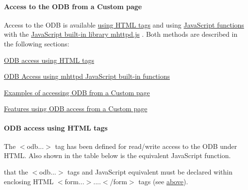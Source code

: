  \paragraph{Access to the ODB from a Custom page}\label{RC_mhttpd_custom_ODB_access}
\par




\par


Access to the ODB is available \hyperlink{RC_mhttpd_custom_ODB_access_RC_mhttpd_custom_odb_html}{using HTML tags} and using \hyperlink{RC_mhttpd_custom_ODB_access_RC_mhttpd_custom_odb_js}{JavaScript functions} with the \hyperlink{RC_mhttpd_custom_js_lib}{JavaScript built-\/in library mhttpd.js} . Both methods are described in the following sections:


\begin{DoxyItemize}
\item \hyperlink{RC_mhttpd_custom_ODB_access_RC_mhttpd_custom_odb_html}{ODB access using HTML tags}
\item \hyperlink{RC_mhttpd_custom_ODB_access_RC_mhttpd_custom_odb_js}{ODB Access using mhttpd JavaScript built-\/in functions}
\item \hyperlink{RC_mhttpd_custom_ODB_access_examples}{Examples of accessing ODB from a Custom page}
\item \hyperlink{RC_mhttpd_custom_ODB_access_features}{Features using ODB access from a Custom page}
\end{DoxyItemize}

\label{RC_mhttpd_custom_ODB_access_idx_odb-HTML-tag}
\hypertarget{RC_mhttpd_custom_ODB_access_idx_odb-HTML-tag}{}
 \hypertarget{RC_mhttpd_custom_ODB_access_RC_mhttpd_custom_odb_html}{}\paragraph{ODB access using HTML tags}\label{RC_mhttpd_custom_ODB_access_RC_mhttpd_custom_odb_html}
The $<$odb...$>$ tag has been defined for read/write access to the ODB under HTML. Also shown in the table below is the equivalent JavaScript function.

that the $<$odb...$>$ tags and JavaScript equivalent must be declared within enclosing HTML $<$form...$>$....$<$/form$>$  tags (see \hyperlink{RC_mhttpd_custom_features_RC_mhttpd_custom_key_access}{above}).

